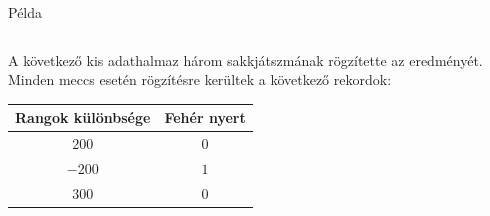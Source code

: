 \documentclass[english, aspectratio=169]{beamer}
\begin{document}
\begin{frame}{Példa}
\begin{columns}
\begin{column}{.5\textwidth}
A következő kis adathalmaz három sakkjátszmának rögzítette az eredményét. Minden meccs esetén rögzítésre kerültek a következő rekordok:\par\medskip
\begin{center}
\begin{tabular}{|c|c|}
\hline
Rangok különbsége & Fehér nyert\\
\hline
$200$ & $0$\\
\hline
$-200$ & $1$\\
\hline
$300$ & $0$\\
\hline
\end{tabular}
\end{center}
\end{column}
\begin{column}{.5\textwidth}

\end{column}
\end{columns}
\end{frame}
\end{document}
